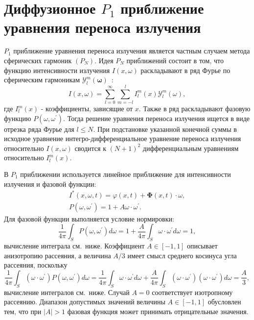 \section{Диффузионное $P_{1}$ приближение уравнения переноса излучения}
\label{sec:ch1/sec2}

$P_{1}$ приближение уравнения переноса излучения является частным случаем метода
сферических гармоник $\left(P_{N}\right)$.
Идея $P_{N}$ приближений состоит в том,
что функцию интенсивности излучения $I(x, \omega)$
раскладывают в ряд Фурье по сферическим гармоникам
$\mathcal{Y}_{l}^{m}(\boldsymbol{\omega})$~\cite[496]{modest2013radiative}:
\[
    I(x, \omega)=\sum_{l=0}^{\infty} \sum_{m=-l}^{l} I_{l}^{m}(x)
    \mathcal{Y}_{l}^{m}(\omega),
\]
где $I_{l}^{m}(x)$ - коэффициенты, зависящие от $x$.
Также в ряд раскладывают фазовую функцию $P\left(\omega, \omega^{\prime}\right)$.
Тогда решение уравнения переноса излучения ищется в виде отрезка ряда Фурье для $l \leqslant N$.
При подстановке указанной конечной суммы в исходное
уравнение интегро-дифференциальное уравнение
переноса излучения относительно $I(x, \omega)$ сводится
к $(N+1)^{2}$ дифференциальным уравнениям
относительно $I_{l}^{m}(x)$.


В $P_{1}$ приближении используется линейное приближение
для интенсивности излучения и фазовой функции:
\begin{gather}
    I^{*}(x, \omega, t) = \varphi(x, t)
    +\boldsymbol{\Phi}(x, t) \cdot \omega, \label{eq:1_2:14}\\
    P\left(\omega, \omega^{\prime}\right)= 1
    + A \omega \cdot \omega^{\prime}. \label{eq:1_2:15}
\end{gather}
Для фазовой функции выполняется условие нормировки:
\[
    \frac{1}{4 \pi} \int_{S} P\left(\omega, \omega^{\prime}\right) d \omega=1+\frac{A}{4 \pi}
    \int_{S} \omega \cdot \omega^{\prime} d \omega=1,
\]
вычисление интеграла см.\ ниже.
Коэффициент $A \in[-1,1]$ описывает анизотропию рассеяния,
а величина $A / 3$ имеет смысл среднего косинуса угла рассеяния, поскольку
\[
    \frac{1}{4 \pi} \int_{S}\left(\omega \cdot \omega^{\prime}\right)
    P\left(\omega, \omega^{\prime}\right) d \omega=\frac{1}{4 \pi}
    \int_{S} \omega \cdot \omega^{\prime} d \omega+\frac{A}{4 \pi}
    \int_{S}\left(\omega \cdot \omega^{\prime}\right)
    \left(\omega \cdot \omega^{\prime}\right) d \omega=\frac{A}{3},
\]
вычисление интегралов см.\ ниже.
Случай $A=0$ соответствует изотропному рассеянию.
Диапазон допустимых значений величины $A \in[-1,1]$ обусловлен тем, что при $|A|>1$
фазовая функция может принимать отрицательные значения.

